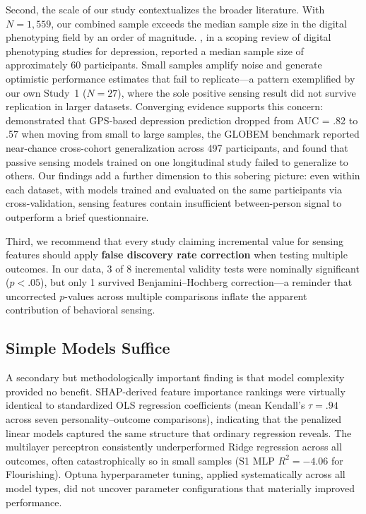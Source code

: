 \documentclass[12pt, a4paper]{article}
\begin{document}
Second, the scale of our study contextualizes the broader literature. With $N = 1{,}559$, our combined sample exceeds the median sample size in the digital phenotyping field by an order of magnitude. \citet{busshart2026scoping}, in a scoping review of digital phenotyping studies for depression, reported a median sample size of approximately 60 participants. Small samples amplify noise and generate optimistic performance estimates that fail to replicate---a pattern exemplified by our own Study~1 ($N = 27$), where the sole positive sensing result did not survive replication in larger datasets. Converging evidence supports this concern: \citet{muller2021depression} demonstrated that GPS-based depression prediction dropped from AUC = .82 to .57 when moving from small to large samples, the GLOBEM benchmark \citep{xu2022globem} reported near-chance cross-cohort generalization across 497 participants, and \citet{adler2022machine} found that passive sensing models trained on one longitudinal study failed to generalize to others. Our findings add a further dimension to this sobering picture: even within each dataset, with models trained and evaluated on the same participants via cross-validation, sensing features contain insufficient between-person signal to outperform a brief questionnaire.

Third, we recommend that every study claiming incremental value for sensing features should apply \textbf{false discovery rate correction} when testing multiple outcomes. In our data, 3 of 8 incremental validity tests were nominally significant ($p < .05$), but only 1 survived Benjamini--Hochberg correction---a reminder that uncorrected $p$-values across multiple comparisons inflate the apparent contribution of behavioral sensing.

\subsection{Simple Models Suffice}

A secondary but methodologically important finding is that model complexity provided no benefit. SHAP-derived feature importance rankings were virtually identical to standardized OLS regression coefficients (mean Kendall's $\tau = .94$ across seven personality--outcome comparisons), indicating that the penalized linear models captured the same structure that ordinary regression reveals. The multilayer perceptron consistently underperformed Ridge regression across all outcomes, often catastrophically so in small samples (S1 MLP $R^2 = -4.06$ for Flourishing). Optuna hyperparameter tuning, applied systematically across all model types, did not uncover parameter configurations that materially improved performance.
\end{document}
